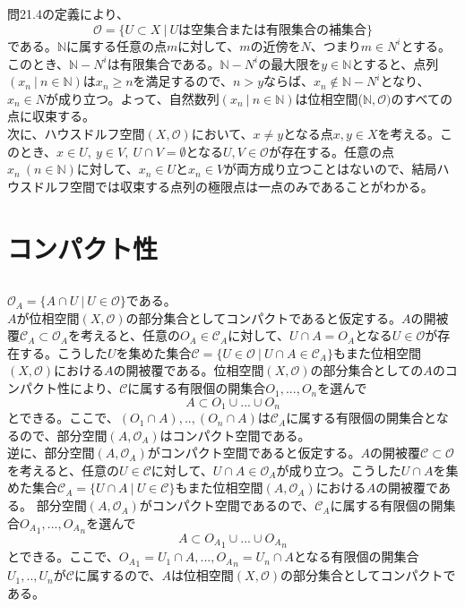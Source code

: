 \documentclass{jsarticle}
\begin{document}
\subsection{}
問21.4の定義により、
\[\mathcal{O}=\{U\subset X\ |\ Uは空集合または有限集合の補集合\}\]
である。$\mathbb{N}$に属する任意の点$m$に対して、$m$の近傍を$N$、つまり$m\in N^i$とする。このとき、$\mathbb{N}-N^i$は有限集合である。$\mathbb{N}-N^i$の最大限を$y\in\mathbb{N}$とすると、点列$(x_n\ |\ n\in\mathbb{N})$は$x_n\geq n $を満足するので、$n>y$ならば、$x_n\notin \mathbb{N}-N^i$となり、$x_n\in N$が成り立つ。よって、自然数列$(x_n\ |\ n\in\mathbb{N})$は位相空間($\mathbb{N},\mathcal{O})$のすべての点に収束する。\\
次に、ハウスドルフ空間$(X,\mathcal{O})$において、$x\neq y$となる点$x,y\in X$を考える。このとき、$x\in U,\ y\in V,\ U\cap V=\emptyset$となる$U,V\in\mathcal{O}$が存在する。任意の点$x_n\ (n\in\mathbb{N})$に対して、$x_n\in U$と$x_n\in V$が両方成り立つことはないので、結局ハウスドルフ空間では収束する点列の極限点は一点のみであることがわかる。





\section{コンパクト性}

\subsection{}
$\mathcal{O}_A=\{A\cap U\ |\ U\in\mathcal{O}\}$である。\\
$A$が位相空間$(X,\mathcal{O})$の部分集合としてコンパクトであると仮定する。$A$の開被覆$\mathcal{C}_A\subset\mathcal{O}_A$を考えると、任意の$O_A\in\mathcal{C}_A$に対して、$U\cap A=O_A$となる$U\in\mathcal{O}$が存在する。こうした$U$を集めた集合$\mathcal{C}=\{U\in\mathcal{O}\ |\ U\cap A\in\mathcal{C}_A\}$もまた位相空間$(X,\mathcal{O})$における$A$の開被覆である。位相空間$(X,\mathcal{O})$の部分集合としての$A$のコンパクト性により、$\mathcal{C}$に属する有限個の開集合$O_1,...,O_n$を選んで
\[A\subset O_1\cup...\cup O_n\]
とできる。ここで、$(O_1\cap A),..,(O_n\cap A)$は$\mathcal{C}_A$に属する有限個の開集合となるので、部分空間$(A,\mathcal{O}_A)$はコンパクト空間である。\\

逆に、部分空間$(A,\mathcal{O}_A)$がコンパクト空間であると仮定する。$A$の開被覆$\mathcal{C}\subset\mathcal{O}$を考えると、任意の$U\in\mathcal{C}$に対して、$U\cap A\in\mathcal{O}_A$が成り立つ。こうした$U\cap A$を集めた集合$\mathcal{C}_A=\{U\cap A\ |\ U\in\mathcal{C}\}$もまた位相空間$(A,\mathcal{O}_A)$における$A$の開被覆である。
部分空間$(A,\mathcal{O}_A)$がコンパクト空間であるので、$\mathcal{C}_A$に属する有限個の開集合${O_A}_1,...,{O_A}_n$を選んで
\[A\subset {O_A}_1\cup...\cup {O_A}_n\]
とできる。ここで、${O_A}_1=U_1\cap A,...,{O_A}_n=U_n\cap A$となる有限個の開集合$U_1,..,U_n$が$\mathcal{C}$に属するので、$A$は位相空間$(X,\mathcal{O})$の部分集合としてコンパクトである。
\end{document}
